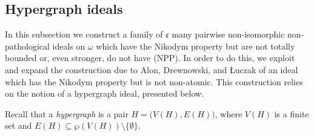 \documentclass[a4paper,11pt,fleqn]{amsart}
\newtheorem{proposition}[theorem]{Proposition}
\theoremstyle{definition}
\theoremstyle{remark}
\numberwithin{equation}{section}
\newcommand{\frakc}{\mathfrak{c}}
\newcommand{\N}{\mathbb{N}}
\newcommand{\iI}{\mathcal{I}}
\newcommand{\pP}{\mathcal{P}}
\DeclareMathOperator{\fin}{Fin}
\newcommand{\sm}{\setminus}
\newcommand{\sub}{\subseteq}
\newcommand{\seqn}[1]{\big\langle#1\colon\ n\io\big\rangle}
\newcommand{\seqk}[1]{\big\langle#1\colon\ k\io\big\rangle}
\newcommand{\io}{\in\omega}%
\begin{document}



\subsection{Hypergraph ideals}\label{sec:hypergraph}

In this subsection we construct a family of $\frakc$ many pairwise non-isomorphic non-pathological ideals on $\omega$ which have the Nikodym property but are not totally bounded or, even stronger, do not have (NPP). In order to do this, we exploit and expand the construction due to Alon, Drewnowski, and \L uczak \cite{ADL09} of an ideal which has the Nikodym property but is not non-atomic. This construction relies on the notion of a hypergraph ideal, presented below.

Recall that a \textit{hypergraph} is a pair $H=\big(V(H),E(H)\big)$, where $V(H)$ is a finite set and $E(H)\sub\wp(V(H))\sm\{\emptyset\}$.
\end{document}
